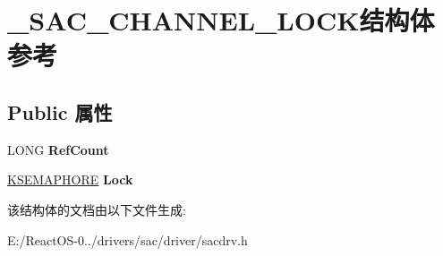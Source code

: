 \hypertarget{struct___s_a_c___c_h_a_n_n_e_l___l_o_c_k}{}\section{\+\_\+\+S\+A\+C\+\_\+\+C\+H\+A\+N\+N\+E\+L\+\_\+\+L\+O\+C\+K结构体 参考}
\label{struct___s_a_c___c_h_a_n_n_e_l___l_o_c_k}
\subsection*{Public 属性}
\begin{DoxyCompactItemize}
\item 
\mbox{\label{struct___s_a_c___c_h_a_n_n_e_l___l_o_c_k_a3774ac9cee01fa0c4136e8337b327e25}} 
L\+O\+NG {\bfseries Ref\+Count}
\item 
\mbox{\label{struct___s_a_c___c_h_a_n_n_e_l___l_o_c_k_a7ec4f10217ae58f789bbeb4b55181272}} 
\hyperlink{struct___k_s_e_m_a_p_h_o_r_e}{K\+S\+E\+M\+A\+P\+H\+O\+RE} {\bfseries Lock}
\end{DoxyCompactItemize}


该结构体的文档由以下文件生成\+:\begin{DoxyCompactItemize}
\item 
E\+:/\+React\+O\+S-\/0../drivers/sac/driver/sacdrv.\+h\end{DoxyCompactItemize}
